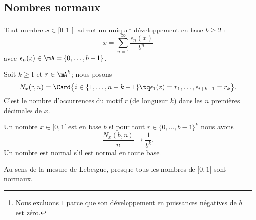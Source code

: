 \subsection{Nombres normaux}

Tout nombre \( x\in \mathopen[ 0 , 1 \mathclose[\) admet un unique\footnote{Nous excluons \( 1\) parce que son développement en puissances négatives de \( b\) est zéro.} développement en base \( b\geq 2\) :
\begin{equation}
    x=\sum_{n=1}^{\infty}\frac{ \epsilon_n(x) }{ b^n }
\end{equation}
avec \( \epsilon_n(x)\in\mA=\{ 0,\ldots, b-1 \}\).

Soit \( k\geq 1\) et \( r\in \mA^k\); nous posons
\begin{equation}
    N_x(r,n)=\Card\big\{   i\in\{ 1,\ldots, n-k+1 \}\tq \epsilon_1(x)=r_1,\ldots, \epsilon_{i+k-1}=r_k \big\}.
\end{equation}
C'est le nombre d'occurrences du motif \( r\) (de longueur \( k\)) dans les \( n\) premières décimales de \( x\).

\begin{definition}
    Un nombre \( x\in\mathopen[ 0 , 1 [\) est  en base \( b\) si pour tout \( r\in\{ 0,\ldots, b-1 \}^k\) nous avons
        \begin{equation}
            \frac{ N_x(b,n) }{ n }\to \frac{1}{ b^k }.
        \end{equation}
    Un nombre est normal s'il est normal en toute base.
\end{definition}

\begin{proposition}     \label{PropEEOXLae}
    Au sens de la mesure de Lebesgue, presque tous les nombres de \( \mathopen[ 0 , 1 [\) sont normaux.    
\end{proposition}

